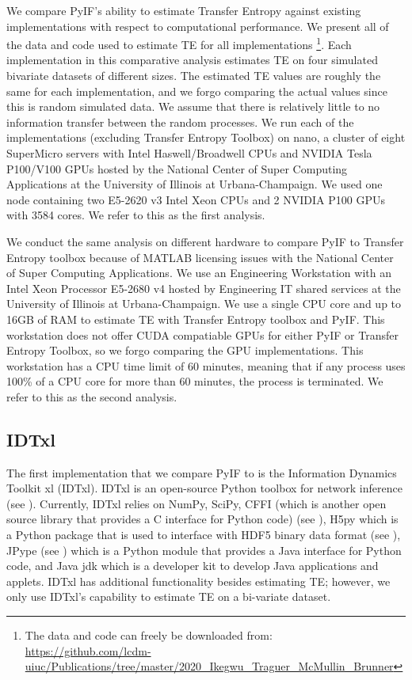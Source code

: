 We compare PyIF's ability to estimate Transfer Entropy against existing implementations with respect to computational performance. We present all of the data and code used to estimate TE for all implementations \footnote{The data and code can freely be downloaded from: \\  \url{https://github.com/lcdm-uiuc/Publications/tree/master/2020\_Ikegwu\_Traguer\_McMullin\_Brunner}}. Each implementation in this comparative analysis estimates TE on four simulated bivariate datasets of different sizes. The estimated TE values are roughly the same for each implementation, and we forgo comparing the actual values since this is random simulated data. We assume that there is relatively little to no information transfer between the random processes. We run each of the implementations (excluding Transfer Entropy Toolbox)  on nano, a cluster of eight SuperMicro servers with Intel Haswell/Broadwell CPUs and NVIDIA Tesla P100/V100 GPUs hosted by the National Center of Super Computing Applications at the University of Illinois at Urbana-Champaign. We used one node containing two E5-2620 v3 Intel Xeon CPUs and 2 NVIDIA P100 GPUs with 3584 cores.  We refer to this as the first analysis.

We conduct the same analysis on different hardware to compare PyIF to Transfer Entropy toolbox because of MATLAB licensing issues with the National Center of Super Computing Applications. We use an Engineering Workstation with an Intel Xeon Processor E5-2680 v4  hosted by Engineering IT shared services at the University of Illinois at Urbana-Champaign. We use a single CPU core and up to 16GB of RAM to estimate TE with Transfer Entropy toolbox and PyIF. This workstation does not offer CUDA compatiable GPUs for either PyIF or Transfer Entropy Toolbox, so we forgo comparing the GPU implementations. This workstation has a CPU time limit of 60 minutes, meaning that if any process uses 100\% of a CPU core for more than 60 minutes, the process is terminated. We refer to this as the second analysis.

\subsection{IDTxl}
The first implementation that we compare PyIF to is the Information Dynamics Toolkit xl (IDTxl). IDTxl is an open-source Python toolbox for network inference (see \cite{IDTxl}). Currently, IDTxl relies on NumPy,  SciPy, CFFI (which is another open source library that provides a C interface for Python code) (see \cite{cffi}),  H5py which is a Python package that is used to interface with HDF5 binary data format (see \cite{hdf5}),  JPype (see \cite{jpype}) which is a Python module that provides a Java interface for Python code, and Java jdk which is a developer kit to develop Java applications and applets.  IDTxl has additional functionality besides estimating TE; however, we only use IDTxl's capability to estimate TE on a bi-variate dataset.


